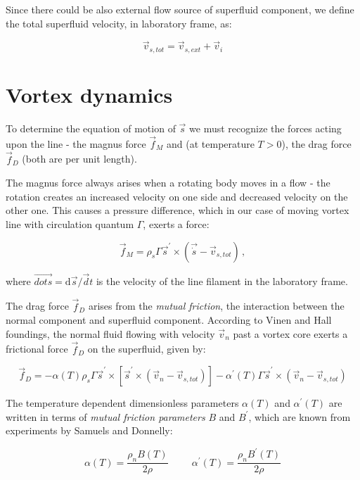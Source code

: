 Since there could be also external flow source of superfluid component, we define the total superfluid velocity, in laboratory frame, as:

\begin{equation}
\vec{v}_{s,tot} = \vec{v}_{s,ext} + \vec{v}_i
\end{equation}

\section{Vortex dynamics}

To determine the equation of motion of $\vec{s}$ we must recognize the forces acting upon the line - the magnus force $\vec{f}_M$ and (at temperature $T>0$), the drag force $\vec{f}_D$ (both are per unit length).

The magnus force always arises when a rotating body moves in a flow - the rotation creates an increased velocity on one side and decreased velocity on the other one. This causes a pressure difference, which in our case of moving vortex line with circulation quantum $\Gamma$, exerts a force:

\begin{equation}
\vec{f}_M = \rho_s \Gamma \vec{s}^{\prime} \times (\vec{\dot{s}} - \vec{v}_{s,tot})\,,
\end{equation}

where $\vec{dot{s}} = \text{d}\vec{s} / \vec{d} t$ is the velocity of the line filament in the laboratory frame.

The drag force $\vec{f}_D$ arises from the \textit{mutual friction}, the interaction between the normal component and superfluid component. According to Vinen and Hall foundings, the normal fluid flowing with velocity $\vec{v}_n$ past a vortex core exerts a frictional force $\vec{f}_D$ on the superfluid, given by:

\begin{equation}
\vec{f}_D = - \alpha(T)\rho_s\Gamma\vec{s}^{\prime} \times [\vec{s}^{\prime} \times (\vec{v}_n - \vec{v}_{s,tot})] - \alpha^{\prime}(T)\Gamma\vec{s}^{\prime} \times (\vec{v}_n - \vec{v}_{s,tot})
\end{equation}

The temperature dependent dimensionless parameters $\alpha(T)$ and $\alpha^{\prime}(T)$ are written in terms of \textit{mutual friction parameters} $B$ and $B^{\prime}$, which are known from experiments by Samuels and Donnelly:

\begin{equation}
\alpha(T) = \frac{\rho_n B(T)}{2\rho}
\hspace{1cm}
\alpha^{\prime}(T) = \frac{\rho_n B^{\prime}(T)}{2\rho}
\end{equation}

